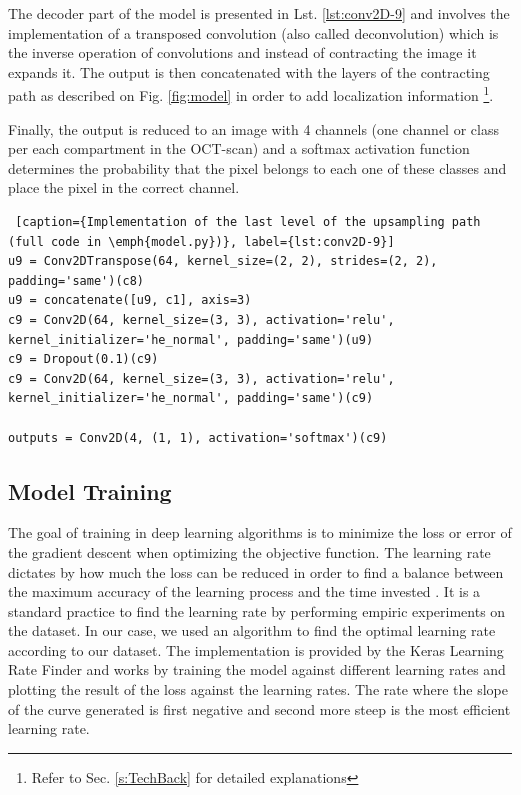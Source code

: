 \documentclass[12pt,a4paper]{scrartcl}
\begin{document}
The decoder part of the model is presented in Lst. \ref{lst:conv2D-9} and involves the implementation of a transposed convolution (also called deconvolution) which is the inverse operation of convolutions and instead of contracting the image it expands it. The output is then concatenated with the layers of the contracting path as described on Fig. \ref{fig:model} in order to add localization information \footnote{Refer to Sec. \ref{s:TechBack} for detailed explanations}.


Finally, the output is reduced to an image with 4 channels (one channel or class per each compartment in the OCT-scan) and a softmax activation function determines the probability that the pixel belongs to each one of these classes and place the pixel in the correct channel.

\begin{lstlisting} [caption={Implementation of the last level of the upsampling path (full code in \emph{model.py})}, label={lst:conv2D-9}]
u9 = Conv2DTranspose(64, kernel_size=(2, 2), strides=(2, 2), padding='same')(c8)
u9 = concatenate([u9, c1], axis=3)
c9 = Conv2D(64, kernel_size=(3, 3), activation='relu', kernel_initializer='he_normal', padding='same')(u9)
c9 = Dropout(0.1)(c9)
c9 = Conv2D(64, kernel_size=(3, 3), activation='relu', kernel_initializer='he_normal', padding='same')(c9)
 
outputs = Conv2D(4, (1, 1), activation='softmax')(c9)
\end{lstlisting}
\subsection{Model Training}\label{ss:model_training}

The goal of training in deep learning algorithms is to minimize the loss or error of the gradient descent when optimizing the objective function. The learning rate dictates by how much the loss can be reduced in order to find a balance between the maximum accuracy of the learning process and the time invested \cite{Zhang2021}. It is a standard practice to find the learning rate by performing empiric experiments on the dataset. In our case, we used an algorithm to find the optimal learning rate according to our dataset. The implementation is provided by the Keras Learning Rate Finder \cite{chollet2015keras} and works by training the model against different learning rates and plotting the result of the loss against the learning rates. The rate where the slope of the curve generated is first negative and second more steep is the most efficient learning rate. 
\end{document}
